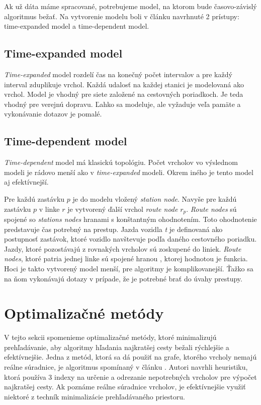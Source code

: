 Ak už dáta máme spracované, potrebujeme model, na ktorom bude časovo-závislý algoritmus bežať. Na vytvorenie modelu boli v článku \cite{models} navrhnuté 2 prístupy: time-expanded model a time-dependent model.

\subsection{Time-expanded model}
\textit{Time-expanded} model rozdelí čas na konečný počet intervalov a pre každý interval zduplikuje vrchol. Každá udalosť na každej stanici je modelovaná ako vrchol. Model je vhodný pre siete založené na cestovných poriadkoch. Je teda vhodný pre verejnú dopravu. Ľahko sa modeluje, ale vyžaduje veľa pamäte a vykonávanie dotazov je pomalé.

\subsection{Time-dependent model}
\textit{Time-dependent} model má klasickú topológiu. Počet vrcholov vo výslednom modeli je rádovo menší ako v \textit{time-expanded} modeli. Okrem iného je tento model aj efektívnejší. 

Pre každú zastávku $p$ je do modelu vložený \textit{station node}. Navyše pre každú zastávku $p$ v linke $r$ je vytvorený ďalší vrchol \textit{route node} $r_p$. \textit{Route nodes} sú spojené so \textit{stations nodes} hranami s konštantným ohodnotením. Toto ohodnotenie predstavuje čas potrebný na prestup. Jazda vozidla \textit{t} je definovaná ako postupnosť zastávok, ktoré vozidlo navštevuje podľa daného cestovného poriadku. Jazdy, ktoré pozostávajú z rovnakých vrcholov sú zoskupené do liniek. \textit{Route nodes}, ktoré patria jednej linke sú spojené hranou , ktorej hodnotou je funkcia. Hoci je takto vytvorený model menší, pre algoritmy je komplikovanejší. Ťažko sa na ňom vykonávajú dotazy v prípade, že je potrebné brať do úvahy prestupy.


\section{Optimalizačné metódy}
\label{sec:optimalization}
V tejto sekcii spomenieme optimalizačné metódy, ktoré minimalizujú prehľadávanie, aby algoritmy hľadania najkratšej cesty bežali rýchlejšie a efektívnejšie. Jedna z metód, ktorá sa dá použiť na grafe, ktorého vrcholy nemajú reálne súradnice, je algoritmus spomínaný v článku \cite{IBAS}. Autori navrhli heuristiku, ktorá používa 3 indexy na určenie a odrezanie nepotrebných vrcholov pre výpočet najkratšej cesty. Ak poznáme reálne súradnice vrcholov, je efektívnejšie využiť niektoré z techník minimalizácie prehľadávaného priestoru.


